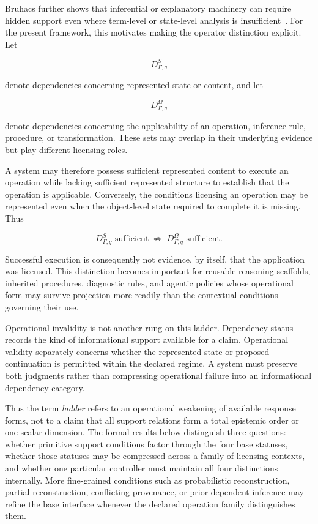 \documentclass[11pt]{article}
\theoremstyle{definition}
\theoremstyle{remark}
\begin{document}
Bruhacs further shows that inferential or explanatory machinery can require hidden support even where term-level or state-level analysis is insufficient~\cite{Bruhacs2026Hidden}. For the present framework, this motivates making the operator distinction explicit. Let

\[
D^{S}_{\Gamma,q}
\]

denote dependencies concerning represented state or content, and let

\[
D^{\Omega}_{\Gamma,q}
\]

denote dependencies concerning the applicability of an operation, inference rule, procedure, or transformation. These sets may overlap in their underlying evidence but play different licensing roles.

A system may therefore possess sufficient represented content to execute an operation while lacking sufficient represented structure to establish that the operation is applicable. Conversely, the conditions licensing an operation may be represented even when the object-level state required to complete it is missing. Thus

\[
D^{S}_{\Gamma,q}\text{ sufficient}
\;\not\Rightarrow\;
D^{\Omega}_{\Gamma,q}\text{ sufficient}.
\]

Successful execution is consequently not evidence, by itself, that the application was licensed. This distinction becomes important for reusable reasoning scaffolds, inherited procedures, diagnostic rules, and agentic policies whose operational form may survive projection more readily than the contextual conditions governing their use.

Operational invalidity is not another rung on this ladder. Dependency status records the kind of informational support available for a claim. Operational validity separately concerns whether the represented state or proposed continuation is permitted within the declared regime. A system must preserve both judgments rather than compressing operational failure into an informational dependency category.

Thus the term \emph{ladder} refers to an operational weakening of available response forms, not to a claim that all support relations form a total epistemic order or one scalar dimension. The formal results below distinguish three questions: whether primitive support conditions factor through the four base statuses, whether those statuses may be compressed across a family of licensing contexts, and whether one particular controller must maintain all four distinctions internally. More fine-grained conditions such as probabilistic reconstruction, partial reconstruction, conflicting provenance, or prior-dependent inference may refine the base interface whenever the declared operation family distinguishes them.
\end{document}
